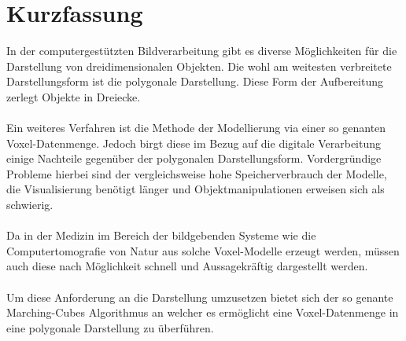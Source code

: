 
\chapter{Kurzfassung}

In der computergestützten Bildverarbeitung gibt es diverse Möglichkeiten für die Darstellung von dreidimensionalen Objekten. Die wohl am weitesten verbreitete Darstellungsform ist die polygonale Darstellung. Diese Form der Aufbereitung zerlegt Objekte in Dreiecke. 
\\\\
Ein weiteres Verfahren ist die Methode der Modellierung via einer so genanten Voxel-Datenmenge. Jedoch birgt diese im Bezug auf die digitale Verarbeitung einige Nachteile gegenüber der polygonalen Darstellungsform. Vordergründige Probleme hierbei sind der vergleichsweise hohe Speicherverbrauch der Modelle, die Visualisierung benötigt länger und Objektmanipulationen erweisen sich als schwierig.
\\\\
Da in der Medizin im Bereich der bildgebenden Systeme wie die Computertomografie von Natur aus solche Voxel-Modelle erzeugt werden, müssen auch diese nach Möglichkeit schnell und Aussagekräftig dargestellt werden.
\\\\
Um diese Anforderung an die Darstellung umzusetzen bietet sich der so genante Marching-Cubes Algorithmus an welcher es ermöglicht eine Voxel-Datenmenge in eine polygonale Darstellung zu überführen. 

